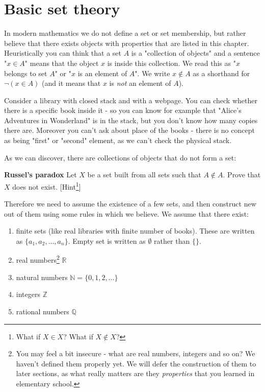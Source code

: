 \section{Basic set theory}
\label{sec:basic_set_theory}
In modern mathematics we do not define a set or set membership, but rather believe that there exists objects with properties that are listed in this chapter.
Heuristically you can think that a set $A$ is a "collection of objects" and a sentence "$x\in A$" means that the object $x$ is inside this collection. We read this as
"$x$ belongs to set $A$" or "$x$ is an element of $A$". We write $x\notin A$ as a shorthand for $\neg (x\in A)$ (and it means that $x$ is \textit{not} an element of $A$).

\begin{example}
  Consider a library with closed stack and with a webpage. You can check whether there is a specific book inside it -
  so you can know for example that "Alice's Adventures in Wonderland"
  is in the stack, but you don't know how many copies there are. Moreover you can't ask about place of the books - there is no concept as being "first" or "second" element,
  as we can't check the physical stack.
\end{example}

As we can discover, there are collections of objects that do not form a set:
\begin{prob}
  \textbf{Russel's paradox}
  Let $X$ be a set built from all sets such that $A\notin A.$ Prove that $X$ does not exist. [Hint\footnote{What if $X\in X$? What if $X\notin X$?}]
\end{prob}

Therefore we need to assume the existence of a few sets, and then construct new out of them using some rules in which we believe. We assume that there exist:

\begin{enumerate}
  \item finite sets (like real libraries with finite number of books). These are written as $\{a_1,a_2,\dots,a_n\}$. Empty set is written as $\emptyset$ rather than $\{\}$.
	\item real numbers\footnote{You may feel a bit insecure - what are real numbers, integers and so on? We haven't defined them properly yet.
    We will defer the construction of them to later sections, as what really matters are they \textit{properties} that you learned in elementary school.} $\mathbb R$
	\item natural numbers $\mathbb N=\{0,1,2,\dots\}$
	\item integers $\mathbb Z$
	\item rational numbers $\mathbb Q$
\end{enumerate}

